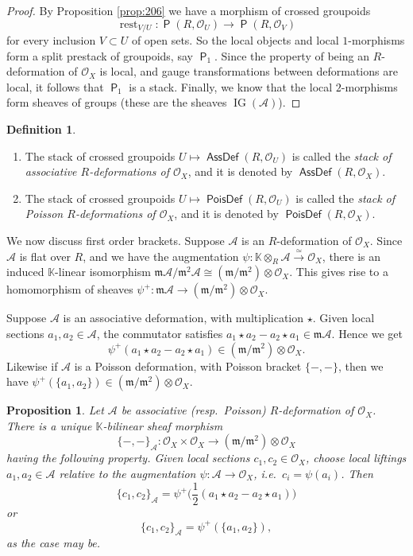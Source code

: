 \documentclass[a4paper, 10pt]{amsart}
\newtheorem{prop}[equation]{Proposition}
\theoremstyle{definition}
\newtheorem{dfn}[equation]{Definition}
\numberwithin{equation}{section}
\newcommand{\iso}{\xrightarrow{\simeq}}
\newcommand{\opn}{\operatorname}
\newcommand{\cat}[1]{\operatorname{\mathsf{#1}}}
\newcommand{\mfrak}[1]{\mathfrak{#1}}
\newcommand{\mcal}[1]{\mathcal{#1}}
\newcommand{\mbb}[1]{\mathbb{#1}}
\newcommand{\smfrac}[2]{\textstyle \frac{#1}{#2}}
\newcommand{\tup}[1]{\textup{#1}}
\newcommand{\bsym}[1]{\boldsymbol{#1}}
\newcommand{\ot}{\otimes}
\newcommand{\K}{\mbb{K}}
\newcommand{\m}{\mfrak{m}}
\newcommand{\OX}{\mcal{O}_X}
\newcommand{\twocat}[1]{\operatorname{\bsym{\cat{#1}}}}
\begin{document}
\begin{proof}
By Proposition \ref{prop:206} we have a morphism of crossed groupoids
\[ \opn{rest}_{V / U} : \cat{P}(R, \mcal{O}_U) \to \cat{P}(R, \mcal{O}_V) \]
for every inclusion $V \subset U$ of open sets. So the local objects and local
$1$-morphisms form a split prestack of groupoids, say $\twocat{P}_1$. Since the
property of being an $R$-deformation of $\OX$ is local, and gauge
transformations between deformations are local, it follows that $\twocat{P}_1$
is a stack.
Finally, we know that the local $2$-morphisms form sheaves of groups
(these are the sheaves $\opn{IG}(\mcal{A})$). 
\end{proof}

\begin{dfn} \label{dfn:210}
\begin{enumerate}
\item The stack of crossed groupoids
$U \mapsto \cat{AssDef}(R, \mcal{O}_U)$ 
is called the {\em stack of associative $R$-deformations of $\OX$},
and it is denoted by $\twocat{AssDef}(R, \mcal{O}_X)$.

\item The stack of crossed groupoids
$U \mapsto \cat{PoisDef}(R, \mcal{O}_U)$ 
is called the {\em stack of Poisson $R$-deformations of $\OX$},
and it is denoted by $\twocat{PoisDef}(R, \mcal{O}_X)$.
\end{enumerate}
\end{dfn}

We now discuss first order brackets.
Suppose $\mcal{A}$ is an $R$-deformation of $\mcal{O}_X$. Since
$\mcal{A}$ is flat over $R$, and we have the augmentation 
$\psi : \K \otimes_R \mcal{A} \iso \mcal{O}_X$,
there is an induced $\K$-linear isomorphism 
$\m \mcal{A} / \m^2 \mcal{A} \cong
(\m / \m^2) \ot  \mcal{O}_X$.
This gives rise to a homomorphism of sheaves
$\psi^+ : \m \mcal{A} \to (\m / \m^2) \ot  \mcal{O}_X$.

Suppose $\mcal{A}$ is an associative deformation, with multiplication
$\star$. Given local sections $a_1,  a_2 \in \mcal{A}$, the
commutator satisfies
$a_1 \star a_2 - a_2 \star a_1 \in \m \mcal{A}$.
Hence we get
\begin{equation} \label{eqn:400}
\psi^+(a_1 \star a_2 - a_2 \star a_1) \in 
(\m / \m^2) \ot  \mcal{O}_X . 
\end{equation}
Likewise if $\mcal{A}$ is a Poisson deformation, with Poisson bracket
$\{ -,- \}$, then we have
$\psi^+(\{ a_1, a_2 \}) \in (\m / \m^2) \ot  \mcal{O}_X$.

\begin{prop} 
Let $\mcal{A}$ be associative \tup{(}resp.\ Poisson\tup{)}
$R$-deformation of $\mcal{O}_X$. 
There is a unique $\K$-bilinear sheaf morphism
\[ \{ -,- \}_{\mcal{A}} : \mcal{O}_X \times \mcal{O}_X \to 
(\m / \m^2) \ot \mcal{O}_X  \]
having the following property.
Given local sections $c_1, c_2 \in \mcal{O}_X$, choose local liftings 
$a_1,  a_2 \in \mcal{A}$ relative to the augmentation
$\psi : \mcal{A} \to \mcal{O}_X$, 
i.e.\ $c_i = \psi(a_i)$. Then 
\[ \{ c_1, c_2 \}_{\mcal{A}} = \psi^+ 
\bigl( \smfrac{1}{2} (a_1 \star a_2 - a_2 \star a_1) \bigr) \]
or
\[ \{ c_1, c_2 \}_{\mcal{A}} = \psi^+(\{ a_1, a_2 \}) , \]
as the case may be.
\end{prop}
\end{document}
